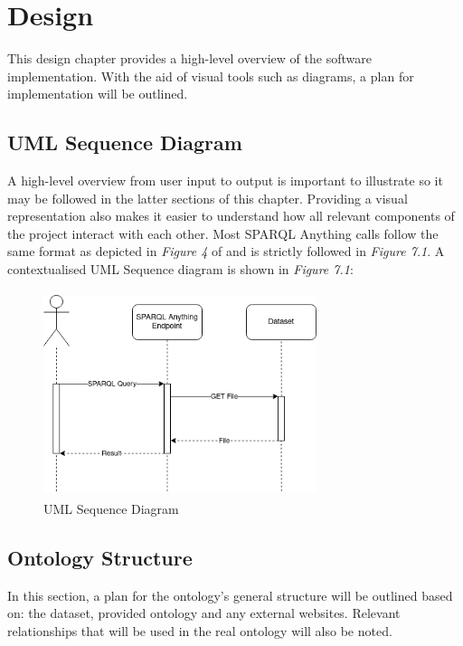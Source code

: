 \chapter{Design}
This design chapter provides a high-level overview of the software implementation. With the aid of visual tools such as diagrams, a plan for implementation will be outlined. 

\section{UML Sequence Diagram}
\hspace{0.5cm} A high-level overview from user input to output is important to illustrate so it may be followed in the latter sections of this chapter. Providing a visual representation also makes it easier to understand how all relevant components of the project interact with each other. Most SPARQL Anything calls follow the same format as depicted in \textit{Figure 4} of \cite{asprino2023knowledge} and is strictly followed in \textit{Figure 7.1}. A contextualised UML Sequence diagram is shown in \textit{Figure 7.1}: 

\begin{figure}[H]
\begin{center}
    \includegraphics[width=8cm, height=6cm]{Images/UMLSequenceDiagram.drawio.png}
\end{center}
\vspace{-0.5cm}
\caption{UML Sequence Diagram}
\end{figure}
\vspace{-0.7cm}

\section{Ontology Structure}
\hspace{0.5cm} In this section, a plan for the ontology's general structure will be outlined based on: the dataset, provided ontology and any external websites. Relevant relationships that will be used in the real ontology will also be noted. 

